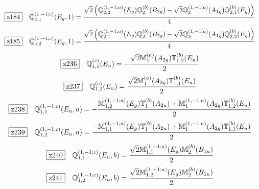 \documentclass[fleqn,10pt,landscape]{jsarticle}
\begin{document}
\begin{dmath*}
\hspace*{3mm}\fbox{z184}\quad \mathbb{Q}_{4,1}^{(1,-1;c)}(E_{g},1)=\frac{\sqrt{2} \left(\mathbb{Q}_{2,2}^{(1,-1;a)}(E_{g}) \mathbb{Q}_{2}^{(b)}(B_{2g}) - \sqrt{3} \mathbb{Q}_{2}^{(1,-1;a)}(A_{1g}) \mathbb{Q}_{2,1}^{(b)}(E_{g})\right)}{4}
\end{dmath*}
\begin{dmath*}
\hspace*{3mm}\fbox{z185}\quad \mathbb{Q}_{4,2}^{(1,-1;c)}(E_{g},1)=\frac{\sqrt{2} \left(\mathbb{Q}_{2,1}^{(1,-1;a)}(E_{g}) \mathbb{Q}_{2}^{(b)}(B_{2g}) - \sqrt{3} \mathbb{Q}_{2}^{(1,-1;a)}(A_{1g}) \mathbb{Q}_{2,2}^{(b)}(E_{g})\right)}{4}
\end{dmath*}
\begin{dmath*}
\hspace*{3mm}\fbox{z236}\quad \mathbb{Q}_{1,1}^{(c)}(E_{u})=- \frac{\sqrt{2} \mathbb{M}_{1}^{(a)}(A_{2g}) \mathbb{T}_{1,2}^{(b)}(E_{u})}{2}
\end{dmath*}
\begin{dmath*}
\hspace*{3mm}\fbox{z237}\quad \mathbb{Q}_{1,2}^{(c)}(E_{u})=\frac{\sqrt{2} \mathbb{M}_{1}^{(a)}(A_{2g}) \mathbb{T}_{1,1}^{(b)}(E_{u})}{2}
\end{dmath*}
\begin{dmath*}
\hspace*{3mm}\fbox{z238}\quad \mathbb{Q}_{1,1}^{(1,-1;c)}(E_{u},a)=- \frac{\mathbb{M}_{1,2}^{(1,-1;a)}(E_{g}) \mathbb{T}_{1}^{(b)}(A_{2u}) + \mathbb{M}_{1}^{(1,-1;a)}(A_{2g}) \mathbb{T}_{1,2}^{(b)}(E_{u})}{2}
\end{dmath*}
\begin{dmath*}
\hspace*{3mm}\fbox{z239}\quad \mathbb{Q}_{1,2}^{(1,-1;c)}(E_{u},a)=\frac{- \mathbb{M}_{1,1}^{(1,-1;a)}(E_{g}) \mathbb{T}_{1}^{(b)}(A_{2u}) + \mathbb{M}_{1}^{(1,-1;a)}(A_{2g}) \mathbb{T}_{1,1}^{(b)}(E_{u})}{2}
\end{dmath*}
\begin{dmath*}
\hspace*{3mm}\fbox{z240}\quad \mathbb{Q}_{1,1}^{(1,-1;c)}(E_{u},b)=\frac{\sqrt{2} \mathbb{M}_{1,1}^{(1,-1;a)}(E_{g}) \mathbb{M}_{2}^{(b)}(B_{1u})}{2}
\end{dmath*}
\begin{dmath*}
\hspace*{3mm}\fbox{z241}\quad \mathbb{Q}_{1,2}^{(1,-1;c)}(E_{u},b)=\frac{\sqrt{2} \mathbb{M}_{1,2}^{(1,-1;a)}(E_{g}) \mathbb{M}_{2}^{(b)}(B_{1u})}{2}
\end{dmath*}
\end{document}
